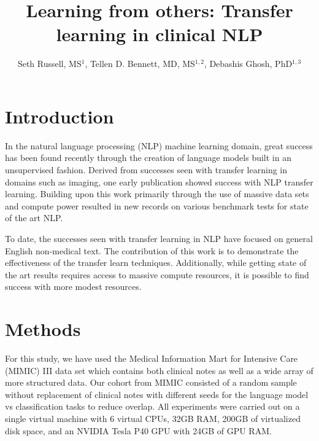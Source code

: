\documentclass{amia}
\begin{document}
\title{Learning from others: Transfer learning in clinical NLP}

\author{Seth Russell, MS$^{1}$,
    Tellen D. Bennett, MD, MS$^{1,2}$,
    Debashis Ghosh, PhD$^{1,3}$}


\maketitle

\section*{Introduction}

In the natural language processing (NLP) machine learning domain, great success has been found recently through the creation of language models built in an unsupervised fashion. Derived from successes seen with transfer learning in domains such as imaging, one early publication \cite{howard_universal_2018} showed success with NLP transfer learning. Building upon this work primarily through the use of massive data sets and compute power \cite{radford_improving_2018,radford_language_2019} resulted in new records on various benchmark tests for state of the art NLP.

To date, the successes seen with transfer learning in NLP have focused on general English non-medical text. The contribution of this work is to demonstrate the effectiveness of the transfer learn techniques. Additionally, while getting state of the art results requires access to massive compute resources, it is possible to find success with more modest resources.

\section*{Methods}

For this study, we have used the Medical Information Mart for Intensive Care (MIMIC) III \cite{johnson_mimic-iii_2016} data set which contains both clinical notes as well as a wide array of more structured data. Our cohort from MIMIC consisted of a random sample without replacement of clinical notes with different seeds for the language model vs classification tasks to reduce overlap. All experiments were carried out on a single virtual machine with 6 virtual CPUs, 32GB RAM, 200GB of virtualized disk space, and an NVIDIA Tesla P40 GPU with 24GB of GPU RAM.
\end{document}
